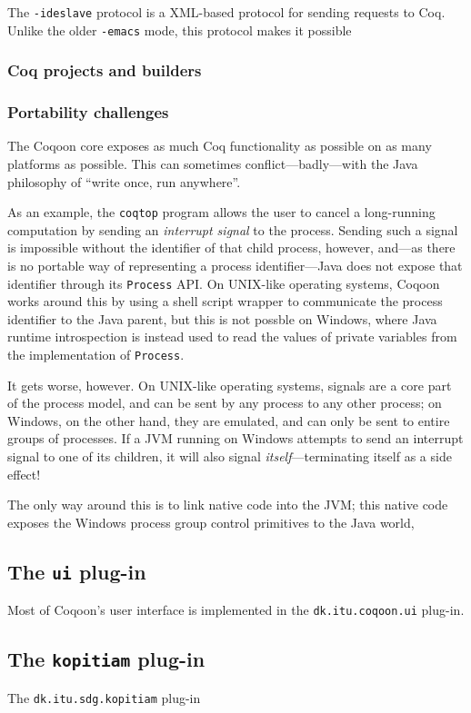 \documentclass{article}
\newcommand{\fdef}[1]{\textit{#1}}
\begin{document}
The \texttt{-ideslave} protocol is a XML-based protocol for sending requests
to Coq. Unlike the older \texttt{-emacs} mode, this protocol makes it possible

\subsubsection{Coq projects and builders}

\subsubsection{Portability challenges}

The Coqoon core exposes as much Coq functionality as possible on as many
platforms as possible. This can sometimes conflict---badly---with the Java
philosophy of ``write once, run anywhere''.

As an example, the \texttt{coqtop} program allows the user to cancel a
long-running computation by sending an \fdef{interrupt signal} to the process.
Sending such a signal is impossible without the identifier of that child
process, however, and---as there is no portable way of representing a process
identifier---Java does not expose that identifier through its \texttt{Process}
API. On UNIX-like operating systems, Coqoon works around this by using a shell
script wrapper to communicate the process identifier to the Java parent, but
this is not possble on Windows, where Java runtime introspection is instead
used to read the values of private variables from the implementation of
\texttt{Process}.

It gets worse, however. On UNIX-like operating systems, signals are a core part
of the process model, and can be sent by any process to any other process; on
Windows, on the other hand, they are emulated, and can only be sent to entire
groups of processes. If a JVM running on Windows attempts to send an interrupt
signal to one of its children, it will also signal \emph{itself}---terminating
itself as a side effect!

The only way around this is to link native code into the JVM; this native code
exposes the Windows process group control primitives to the Java world, 

\subsection{The \texttt{ui} plug-in}

Most of Coqoon's user interface is implemented in the
\texttt{dk.itu.coqoon.ui} plug-in.

\subsection{The \texttt{kopitiam} plug-in}

The \texttt{dk.itu.sdg.kopitiam} plug-in
\end{document}
